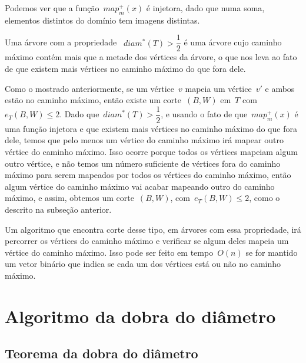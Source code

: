 \documentclass[a4paper,12pt]{article}
\begin{document}
	\medskip
	\medskip

	Podemos ver que a função~$map^+_m(x)$ é injetora, dado que numa
	soma, elementos distintos do domínio tem imagens distintas.

	Uma árvore com a propriedade ~$diam^*(T)>\dfrac{1}{2}$ é uma
	árvore cujo caminho máximo contém mais que a metade dos 
	vértices da árvore, o que nos leva ao fato de que existem mais 
	vértices no caminho máximo do que fora dele. 

	Como o mostrado anteriormente, se um vértice~$v$ mapeia um
	vértice~$v'$ e ambos estão no caminho máximo, então existe um
	corte~$(B,W)$ em~$T$ com~$e_T(B,W)\le 2$.
	Dado que~$diam^*(T)>\dfrac{1}{2}$, e usando o fato de 
	que~$map^+_m(x)$ é uma função injetora e que
	existem mais vértices no caminho máximo do que fora dele,
	temos que pelo menos um vértice do caminho máximo irá mapear
	outro vértice do caminho máximo. Isso ocorre porque todos
	os vértices mapeiam algum outro vértice, e não temos um 
	número suficiente de vértices fora do caminho máximo para serem
	mapeados por todos os vértices do caminho máximo, então algum
	vértice do caminho máximo vai acabar mapeando outro do caminho
	máximo, e assim, obtemos um corte~$(B,W)$, com~$e_T(B,W)\le 2$,
	como o descrito na subseção anterior.

	Um algoritmo que encontra corte desse tipo, em árvores com 
	essa propriedade, irá percorrer os vértices do caminho máximo
	e verificar se algum deles mapeia um vértice do caminho máximo.
	Isso pode ser feito em tempo~$O(n)$ se for mantido um vetor 
	binário que indica se cada um dos vértices está ou não no
	caminho máximo.




\newpage
\section {Algoritmo da dobra do diâmetro}
	
	\subsection{Teorema da dobra do diâmetro}
	
\end{document}
